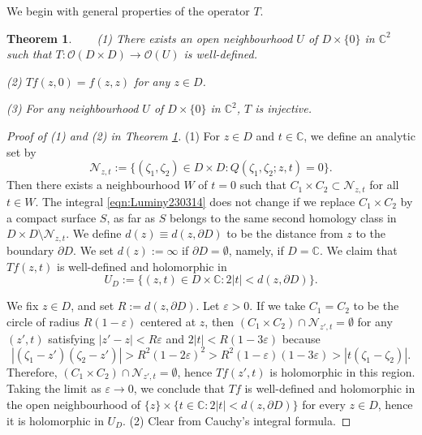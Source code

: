 \documentclass[12pt,leqno]{amsart}
\theoremstyle{plain}
\newtheorem{theorem}[thm]{Theorem}
\theoremstyle{definition}
\begin{document}
We begin with general properties of the operator $T$.  
\begin{theorem}
\label{thm:23032333}
~~~
\newline
{\rm{(1)}}\enspace
There exists an open neighbourhood $U$ of $D \times \{0\}$
 in ${\mathbb{C}}^2$ 
such that $T \colon {\mathcal{O}}(D \times D) \to {\mathcal{O}}(U)$
 is well-defined.  
\par\noindent
{\rm{(2)}}\enspace
$T f(z,0)=f(z,z)$ for any $z \in D$.  
\par\noindent
{\rm{(3)}}\enspace
For any neighbourhood $U$ of $D \times \{0\}$ in ${\mathbb{C}}^2$, 
 $T$ is injective.  
\end{theorem}



\begin{proof}[Proof of (1) and (2) in Theorem \ref{thm:23032333}]
(1)\enspace
For $z \in D$ and $t \in {\mathbb{C}}$, 
 we define an analytic set by 
\[
 {\mathcal{N}}_{z,t}:=
 \{(\zeta_1, \zeta_2)\in D \times D:
  Q(\zeta_1, \zeta_2;z,t)=0\}.  
\]
Then there exists a neighbourhood $W$ of $t=0$ such that 
$C_1\times C_2\subset  {\mathcal{N}}_{z,t}$ for all $t\in W$.
The integral \eqref{eqn:Luminy230314} does not change
 if we replace $C_1 \times C_2$ 
 by a compact surface $S$, 
 as far as $S$ belongs to the same second homology class
in $D \times D \setminus {\mathcal{N}}_{z,t}$.  
We define $d(z)\equiv d(z,\partial D)$
 to be the distance from $z$
 to the boundary $\partial D$.  
We set $d(z):=\infty$ if $\partial D=\emptyset$, 
 namely, 
 if $D={\mathbb{C}}$.  
We claim that $T f (z,t)$ is well-defined
 and holomorphic in 
\begin{equation}
\label{eqn:UD}
  U_D:=\{(z,t) \in D \times {\mathbb{C}}:
  2|t|< d(z, \partial D)\}.  
\end{equation}



We fix $z\in D$, and set $R:=d(z,\partial D)$. Let $\varepsilon>0$. 
 If we take $C_1=C_2$ 
 to be the circle of radius $R(1-\varepsilon)$
 centered at $z$, 
 then $(C_1 \times C_2) \cap  {\mathcal{N}}_{z',t}=\emptyset$
 for any $(z',t)$ satisfying $|z'-z|< R \varepsilon$
 and $2|t|<R(1-3 \varepsilon)$
 because
\[
  |(\zeta_1-z')(\zeta_2-z')| 
  >
  R^2(1-2\varepsilon)^2
  >
  R^2(1-\varepsilon)(1-3 \varepsilon)
  > 
  |t(\zeta_1-\zeta_2)|.  
\]
Therefore, $(C_1\times C_2)\cap {\mathcal{N}}_{z',t}=\emptyset$, hence
 $T f(z',t)$ is holomorphic 
 in this region.  
Taking the limit as $\varepsilon \to 0$, 
 we conclude 
 that $T f$ is well-defined 
 and holomorphic in the open neighbourhood 
 of $\{z\}\times\{ t\in\mathbb C : 2\vert t\vert< d(z,\partial D)\}$ for every $z\in D$, hence it is
 holomorphic in $U_D$.  
\newline
(2)\enspace
Clear from Cauchy's integral formula.  
\end{proof}
\end{document}
